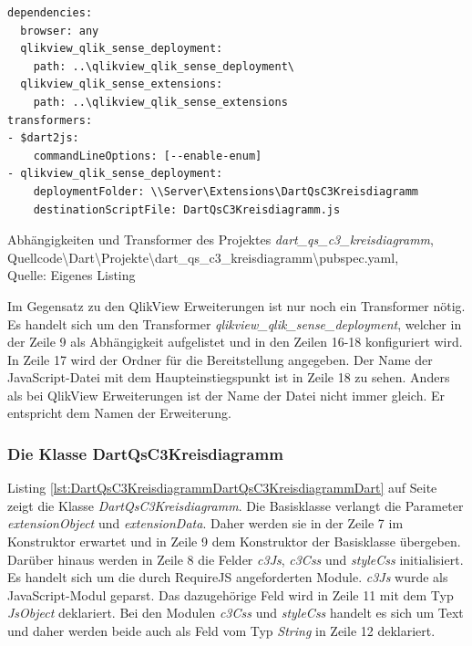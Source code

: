 \begin{listing}[htbp]
\begin{verbatim}
dependencies:
  browser: any
  qlikview_qlik_sense_deployment:
    path: ..\qlikview_qlik_sense_deployment\
  qlikview_qlik_sense_extensions:
    path: ..\qlikview_qlik_sense_extensions
transformers:
- $dart2js:
    commandLineOptions: [--enable-enum]
- qlikview_qlik_sense_deployment:
    deploymentFolder: \\Server\Extensions\DartQsC3Kreisdiagramm
    destinationScriptFile: DartQsC3Kreisdiagramm.js
\end{verbatim}
\caption[Abhängigkeiten und Transformer des Projektes \textit{dart\_qs\_c3\_kreisdiagramm}]{Abhängigkeiten und Transformer des Projektes \textit{dart\_qs\_c3\_kreisdiagramm}, \\Quellcode\textbackslash{}Dart\textbackslash{}Projekte\textbackslash{}dart\_qs\_c3\_kreisdiagramm\textbackslash{}pubspec.yaml, \\Quelle: Eigenes Listing}
\label{lst:DartQsC3KreisdiagrammPubspecYaml}
\end{listing}

Im Gegensatz zu den QlikView Erweiterungen ist nur noch ein Transformer nötig. Es handelt sich um den Transformer \textit{qlikview\_qlik\_sense\_deployment}, welcher in der Zeile 9 als Abhängig\-keit aufgelistet und in den Zeilen 16-18 konfiguriert wird. In Zeile 17 wird der Ordner für die Bereitstellung angegeben. Der Name der JavaScript-Datei mit dem Haupteinstiegspunkt ist in Zeile 18 zu sehen. Anders als bei QlikView Erweiterungen ist der Name der Datei nicht immer gleich. Er entspricht dem Namen der Erweiterung. 

\subsubsection{Die Klasse DartQsC3Kreisdiagramm}

Listing \ref{lst:DartQsC3KreisdiagrammDartQsC3KreisdiagrammDart} auf Seite \pageref{lst:DartQsC3KreisdiagrammDartQsC3KreisdiagrammDart} zeigt die Klasse \textit{DartQsC3Kreisdiagramm}. Die Basisklasse verlangt die Parameter \textit{extensionObject} und \textit{extensionData}. Daher werden sie in der Zeile 7 im Konstruktor erwartet und in Zeile 9 dem Konstruktor der Basisklasse übergeben. Darüber hinaus werden in Zeile 8 die Felder \textit{c3Js}, \textit{c3Css} und \textit{styleCss} initialisiert. Es handelt sich um die durch RequireJS angeforderten Module. \textit{c3Js} wurde als JavaScript-Modul geparst. Das dazugehörige Feld wird in Zeile 11 mit dem Typ \textit{JsObject} deklariert. Bei den Modulen \textit{c3Css} und \textit{styleCss} handelt es sich um Text und daher werden beide auch als Feld vom Typ \textit{String} in Zeile 12 deklariert.



